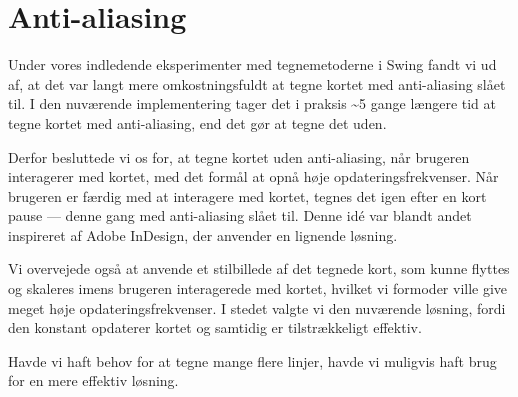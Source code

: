\section{Anti-aliasing}

Under vores indledende eksperimenter med tegnemetoderne i Swing fandt vi ud af, at det var langt mere omkostningsfuldt at tegne kortet med anti-aliasing slået til. I den nuværende implementering tager det i praksis \textasciitilde5 gange længere tid at tegne kortet med anti-aliasing, end det gør at tegne det uden.

Derfor besluttede vi os for, at tegne kortet uden anti-aliasing, når brugeren interagerer med kortet, med det formål at opnå høje opdateringsfrekvenser. Når brugeren er færdig med at interagere med kortet, tegnes det igen efter en kort pause --- denne gang med anti-aliasing slået til. Denne idé var blandt andet inspireret af Adobe InDesign, der anvender en lignende løsning.

Vi overvejede også at anvende et stilbillede af det tegnede kort, som kunne flyttes og skaleres imens brugeren interagerede med kortet, hvilket vi formoder ville give meget høje opdateringsfrekvenser. I stedet valgte vi den nuværende løsning, fordi den konstant opdaterer kortet og samtidig er tilstrækkeligt effektiv.

Havde vi haft behov for at tegne mange flere linjer, havde vi muligvis haft brug for en mere effektiv løsning.